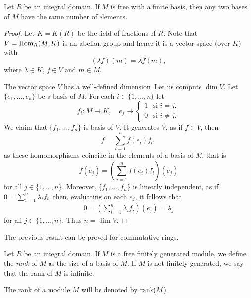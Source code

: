 \begin{theorem}
Let $R$ be an integral domain. If $M$ is free with a finite basis, then 
any two bases of $M$ have the same number of elements.
\end{theorem}

\begin{proof}
Let $K=K(R)$ be the field of fractions of $R$. Note that 
$V=\operatorname{Hom}_R(M,K)$ is an abelian group and hence it 
is a vector space (over $K$) with 
\[
(\lambda f)(m)=\lambda f(m),
\]
where $\lambda\in K$, $f\in V$ and $m\in M$.

The vector space $V$ has a well-defined dimension. 
Let us compute $\dim V$. Let $\{e_1,\dots,e_n\}$ be a basis of $M$. 
For each $i\in\{1,\dots,n\}$ let 
\[
f_i\colon M\to K,\quad
e_j\mapsto\begin{cases}
1 & \text{si $i=j$},\\
0 & \text{si $i\ne j$}.
\end{cases}
\]
We claim that $\{f_1,\dots,f_n\}$ is basis of  $V$. It generates $V$, as  
if $f\in V$, then 
\[
f=\sum_{i=1}^n f(e_i)f_i,
\]
as these homomorphisms coincide in the elements of a basis of $M$, that is 
\[
f(e_j)=(\sum_{i=1}^n f(e_i)f_i)(e_j)
\]
for all $j\in\{1,\dots,n\}$.    
Moreover, $\{f_1,\dots,f_n\}$ is linearly independent, as if $0=\sum_{i=1}^n\lambda_if_i$, 
then, evaluating on each $e_j$, it follows that 
\begin{align*}
0=\left(\sum_{i=1}^n \lambda_if_i\right)(e_j)=\lambda_j
\end{align*}
for all $j\in\{1,\dots,n\}$. Thus $n=\dim V$. 
\end{proof}

The previous result can be proved for commutative rings. 

\begin{definition}
Let $R$ be an integral domain. If $M$ is a free 
finitely generated module, we define
the \emph{rank} of $M$ as the size of a basis of $M$. If $M$ is not finitely generated, 
we say that the rank of $M$ is infinite. 
\end{definition}

The rank of a module $M$ will be denoted by $\operatorname{rank}(M)$.   
